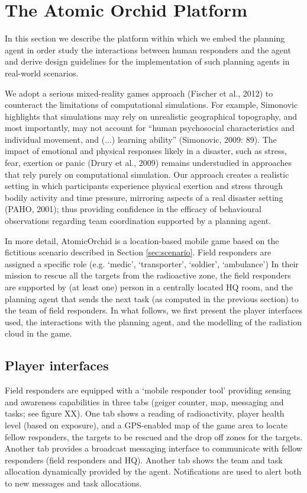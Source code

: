\section{The Atomic Orchid Platform}
In this section we describe the platform within which we embed the planning agent in order study the interactions between human responders and the agent and derive design guidelines for the implementation of such planning agents in real-world scenarios. 

We adopt a serious mixed-reality games approach (Fischer et al., 2012) to counteract the limitations of computational simulations. For example, Simonovic highlights that simulations may rely on unrealistic geographical topography, and most importantly, may not account for ``human psychosocial characteristics and individual movement, and (...) learning ability'' (Simonovic, 2009: 89). The impact of emotional and physical responses likely in a disaster, such as stress, fear, exertion or panic (Drury et al., 2009) remains understudied in approaches that rely purely on computational simulation. Our approach creates a realistic setting in which participants experience physical exertion and stress through bodily activity and time pressure, mirroring aspects of a real disaster setting (PAHO, 2001); thus providing confidence in the efficacy of behavioural observations regarding team coordination supported by a planning agent.

In more detail, AtomicOrchid is a location-based mobile game based on the fictitious scenario described in Section \ref{sec:scenario}. Field responders are assigned a specific role (e.g. `medic', `transporter', `soldier', `ambulance') 
In their mission to rescue all the targets from the radioactive zone, the field responders are supported by (at least one) person in a centrally located HQ room, and the planning agent that sends the next task (as computed in the previous section) to the team of field responders. In what follows, we first present the player interfaces used, the interactions with the planning agent, and the modelling of the radiation cloud in the game.

\subsection{Player interfaces}
Field responders are equipped with a `mobile responder tool' providing sensing and awareness capabilities in three tabs (geiger counter, map, messaging and tasks; see figure XX). One tab shows a reading of radioactivity, player health level (based on exposure), and a GPS-enabled map of the game area to locate fellow responders, the targets to be rescued and the drop off zones for the targets. Another tab provides a broadcast messaging interface to communicate with fellow responders (field responders and HQ). Another tab shows the team and task allocation dynamically provided by the agent. Notifications are used to alert both to new messages and task allocations.

